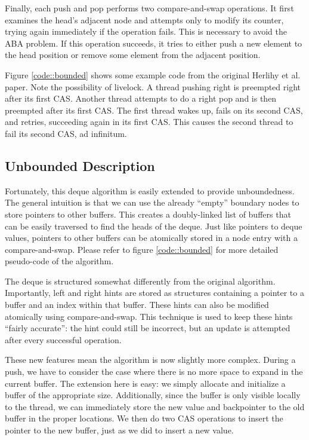 \documentclass[11pt, letterpaper]{article}
\begin{document}
            Finally, each push and pop performs two compare-and-swap operations. It first examines the head's adjacent node and attempts only to modify its counter, trying again immediately if the operation fails. This is necessary to avoid the ABA problem. If this operation succeeds, it tries to either push a new element to the head position or remove some element from the adjacent position.

            Figure \ref{code::bounded} shows some example code from the original Herlihy et al. paper. Note the possibility of livelock. A thread pushing right is preempted right after its first CAS. Another thread attempts to do a right pop and is then preempted after its first CAS. The first thread wakes up, fails on its second CAS, and retries, succeeding again in its first CAS. This causes the second thread to fail its second CAS, ad infinitum.

        \subsection{Unbounded Description}
            Fortunately, this deque algorithm is easily extended to provide unboundedness. The general intuition is that we can use the already ``empty'' boundary nodes to store pointers to other buffers. This creates a doubly-linked list of buffers that can be easily traversed to find the heads of the deque. Just like pointers to deque values, pointers to other buffers can be atomically stored in a node entry with a compare-and-swap. Please refer to figure \ref{code::bounded} for more detailed pseudo-code of the algorithm.

            The deque is structured somewhat differently from the original algorithm. Importantly, left and right hints are stored as structures containing a pointer to a buffer and an index within that buffer. These hints can also be modified atomically using compare-and-swap. This technique is used to keep these hints ``fairly accurate'': the hint could still be incorrect, but an update is attempted after every successful operation.

            These new features mean the algorithm is now slightly more complex. During a push, we have to consider the case where there is no more space to expand in the current buffer. The extension here is easy: we simply allocate and initialize a buffer of the appropriate size. Additionally, since the buffer is only visible locally to the thread, we can immediately store the new value and backpointer to the old buffer in the proper locations. We then do two CAS operations to insert the pointer to the new buffer, just as we did to insert a new value.
\end{document}
